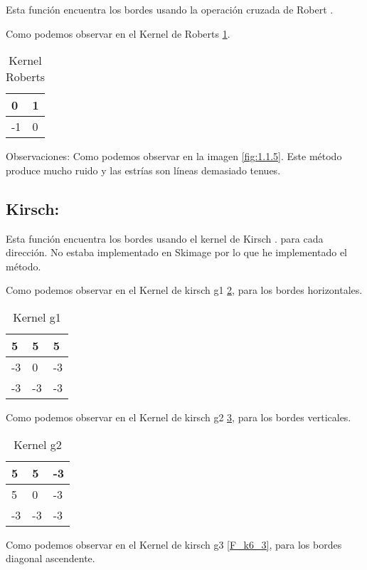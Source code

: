Esta función encuentra los bordes usando la operación cruzada de Robert \cite{wiki:Roberts}.

Como podemos observar en el Kernel de Roberts \ref{F_k5}.
\begin{table}[]
	\centering
	\caption{Kernel Roberts}
	\label{F_k5}
	\begin{tabular}{|l|l|}
		\hline
		0  & 1 \\ \hline
		-1 & 0 \\ \hline
	\end{tabular}
\end{table}




Observaciones:
Como podemos observar en la imagen \ref{fig:1.1.5}.
Este método produce mucho ruido y las estrías son líneas demasiado tenues.

\subsection{Kirsch:}
Esta función encuentra los bordes usando el kernel de Kirsch \cite{wiki:Kirsch}.
para cada dirección.
No estaba implementado en Skimage por lo que he implementado el método.

Como podemos observar en el Kernel de kirsch g1 \ref{F_k6_1}, para los bordes horizontales.
\begin{table}[]
	\centering
	\caption{Kernel g1}
	\label{F_k6_1}
	\begin{tabular}{|l|l|l|}
		\hline
		5  & 5  & 5  \\ \hline
		-3 & 0  & -3 \\ \hline
		-3 & -3 & -3 \\ \hline
	\end{tabular}
\end{table}

Como podemos observar en el Kernel de kirsch g2 \ref{F_k6_2}, para los bordes verticales.
\begin{table}[]
	\centering
	\caption{Kernel g2}
	\label{F_k6_2}
	\begin{tabular}{|l|l|l|}
		\hline
		5  & 5  & -3  \\ \hline
		5 & 0  & -3 \\ \hline
		-3 & -3 & -3 \\ \hline
	\end{tabular}
\end{table}


Como podemos observar en el Kernel de kirsch g3 \ref{F_k6_3}, para los bordes diagonal ascendente.

